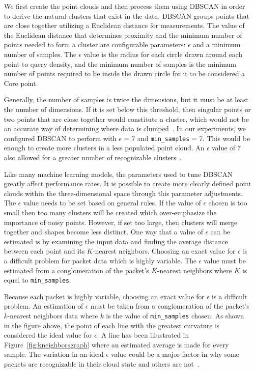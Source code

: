 We first create the point clouds and then process them using DBSCAN in order to derive the natural clusters that exist in the data. DBSCAN groups points that are close together utilizing a Euclidean distance for measurements. The value of the Euclidean distance that determines proximity and the minimum number of points needed to form a cluster are configurable parameters: $\epsilon$ and a minimum number of samples. The $\epsilon$ value is the radius for each circle drawn around each point to query density, and the minimum number of samples is the minimum number of points required to be inside the drawn circle for it to be considered a Core point.

Generally, the number of samples is twice the dimensions, but it must be at least the number of dimensions. If it is set below this threshold, then singular points or two points that are close together would constitute a cluster, which would not be an accurate way of determining where data is clumped~\cite{mullin2020tuning}. In our experiments, we configured DBSCAN to perform with $\epsilon$ = 7 and \texttt{min\_samples} = 7. This would be enough to create more clusters in a less populated point cloud. An $\epsilon$ value of 7 also allowed for a greater number of recognizable clusters~\cite{rahmah2016determination}.

Like many machine learning models, the parameters used to tune DBSCAN greatly affect performance rates. It is possible to create more clearly defined point clouds within the three-dimensional space through this parameter adjustments. The $\epsilon$ value needs to be set based on general rules. If the value of $\epsilon$ chosen is too small then too many clusters will be created which over-emphasize the importance of noisy points. However, if set too large, then clusters will merge together and shapes become less distinct. One way that a value of $\epsilon$ can be estimated is by examining the input data and finding the average distance between each point and its $K$-nearest neighbors. Choosing an exact value for $\epsilon$ is a difficult problem for packet data which is highly variable. The $\epsilon$ value must be estimated from a conglomeration of the packet's $K$-nearest neighbors where $K$ is equal to \texttt{min\_samples}.

Because each packet is highly variable, choosing an exact value for $\epsilon$ is a difficult problem. An estimation of $\epsilon$ must be taken from a conglomeration of the packet's $k$-nearest neighbors data where $k$ is the value of \texttt{min\_samples} chosen. As shown in the figure above, the point of each line with the greatest curvature is considered the ideal value for $\epsilon$. A line has been illustrated in Figure~\ref{fig:kneighborsgraph} where an estimated average is made for every sample. The variation in an ideal $\epsilon$ value could be a major factor in why some packets are recognizable in their cloud state and others are not~\cite{rahmah2016determination}.

